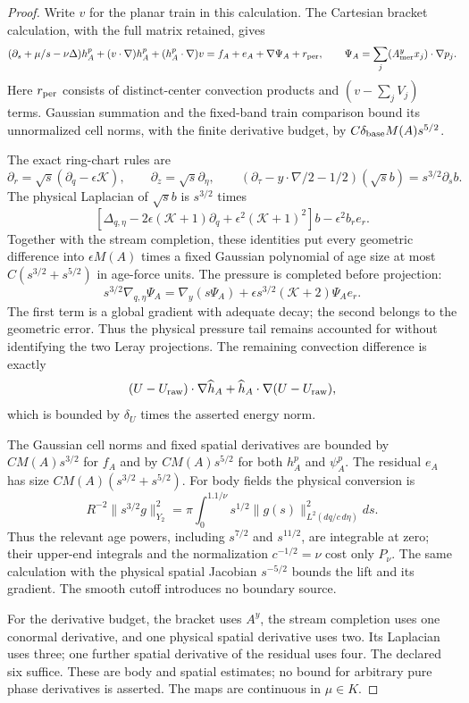 \begin{proof}
Write $v$ for the planar train in this calculation. The Cartesian
bracket calculation, with the full matrix retained, gives
\[
 (\partial_s+\mu/s-\nu\Delta)h_A^p
 +(v\cdot\nabla)h_A^p+(h_A^p\cdot\nabla)v
       =f_A+e_A+\nabla\Psi_A+r_{\rm per},\qquad
 \Psi_A=\sum_j(A^y_{\rm mer}x_j)\cdot\nabla p_j.
\]
Here $r_{\rm per}$ consists of distinct-center convection products
and $(v-\sum_jV_j)$ terms. Gaussian summation and the fixed-band
train comparison bound its unnormalized cell norms, with the finite
derivative budget, by $C\delta_{\rm base}M(A)s^{5/2}$.

The exact ring-chart rules are
\[
 \partial_r=\sqrt s(\partial_q-\epsilon\mathcal K),\qquad
 \partial_z=\sqrt s\partial_\eta,\qquad
 (\partial_\tau-y\cdot\nabla/2-1/2)(\sqrt s b)
       =s^{3/2}\partial_s b.
\]
The physical Laplacian of $\sqrt s b$ is $s^{3/2}$ times
\[
 [\Delta_{q,\eta}-2\epsilon(\mathcal K+1)\partial_q
       +\epsilon^2(\mathcal K+1)^2]b-\epsilon^2b_r e_r.
\]
Together with the stream completion, these identities put every
geometric difference into $\epsilon M(A)$ times a fixed Gaussian
polynomial of age size at most $C(s^{3/2}+s^{5/2})$ in age-force units.
The pressure is completed before projection:
\[
 s^{3/2}\nabla_{q,\eta}\Psi_A
 =\nabla_y(s\Psi_A)+\epsilon s^{3/2}(\mathcal K+2)\Psi_Ae_r.
\]
The first term is a global gradient with adequate decay; the second
belongs to the geometric error. Thus the physical pressure tail
remains accounted for without identifying the two Leray projections.
The remaining convection difference is exactly
\[
 (U-U_{\rm raw})\cdot\nabla\widehat h_A
            +\widehat h_A\cdot\nabla(U-U_{\rm raw}),
\]
which is bounded by $\delta_U$ times the asserted energy norm.

The Gaussian cell norms and fixed spatial derivatives are bounded by
$CM(A)s^{3/2}$ for $f_A$ and by $CM(A)s^{5/2}$ for both
$h_A^p$ and $\psi_A^p$.
The residual $e_A$ has size $CM(A)(s^{3/2}+s^{5/2})$.
For body fields the physical conversion is
\[
 R^{-2}\|s^{3/2}g\|_{Y_2}^2
   =\pi\int_0^{1.1/\nu}s^{1/2}
                   \|g(s)\|_{L^2(dq/c\,d\eta)}^2ds.
\]
Thus the relevant age powers, including $s^{7/2}$ and $s^{11/2}$,
are integrable at zero; their upper-end integrals and the normalization
$c^{-1/2}=\nu$ cost only $P_\nu$. The same calculation with the
physical spatial Jacobian $s^{-5/2}$ bounds the lift and its gradient.
The smooth cutoff introduces no boundary source.

For the derivative budget, the bracket uses $A^y$, the stream
completion uses one conormal derivative, and one physical spatial
derivative uses two. Its Laplacian uses three; one further spatial
derivative of the residual uses four. The declared six suffice.
These are body and spatial estimates; no bound for arbitrary pure
phase derivatives is asserted. The maps are continuous in $\mu\in K$.
\end{proof}

